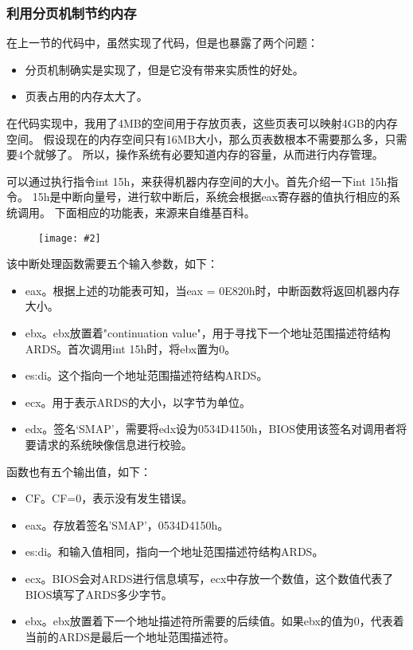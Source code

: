 \documentclass[a4paper,left=2.5cm,right=2.5cm,11pt]{article}
\newcommand{\sizedfic}[2]{\begin{figure}[H]
		\center
		\texttt{[image: \#2]}
	\end{figure}}
\begin{document}
\subsubsection{利用分页机制节约内存}
	在上一节的代码中，虽然实现了代码，但是也暴露了两个问题：
	\begin{itemize}
		\item 分页机制确实是实现了，但是它没有带来实质性的好处。
		\item 页表占用的内存太大了。
	\end{itemize}

	在代码实现中，我用了4MB的空间用于存放页表，这些页表可以映射4GB的内存空间。
	假设现在的内存空间只有16MB大小，那么页表数根本不需要那么多，只需要4个就够了。
	所以，操作系统有必要知道内存的容量，从而进行内存管理。\par

	可以通过执行指令int 15h，来获得机器内存空间的大小。首先介绍一下int 15h指令。
	15h是中断向量号，进行软中断后，系统会根据eax寄存器的值执行相应的系统调用。
	下面相应的功能表，来源来自维基百科。
	\sizedfic{1}{6.png}
	
	该中断处理函数需要五个输入参数，如下：
	\begin{itemize}
		\item eax。根据上述的功能表可知，当eax = 0E820h时，中断函数将返回机器内存大小。
		\item ebx。ebx放置着"continuation value"，用于寻找下一个地址范围描述符结构ARDS。首次调用int 15h时，将ebx置为0。
		\item es:di。这个指向一个地址范围描述符结构ARDS。
		\item ecx。用于表示ARDS的大小，以字节为单位。
		\item edx。签名‘SMAP’，需要将edx设为0534D4150h，BIOS使用该签名对调用者将要请求的系统映像信息进行校验。
	\end{itemize}

	函数也有五个输出值，如下：
	\begin{itemize}
		\item CF。CF=0，表示没有发生错误。
		\item eax。存放着签名'SMAP'，0534D4150h。
		\item es:di。和输入值相同，指向一个地址范围描述符结构ARDS。
		\item ecx。BIOS会对ARDS进行信息填写，ecx中存放一个数值，这个数值代表了BIOS填写了ARDS多少字节。
		\item ebx。ebx放置着下一个地址描述符所需要的后续值。如果ebx的值为0，代表着当前的ARDS是最后一个地址范围描述符。
	\end{itemize}
\end{document}
